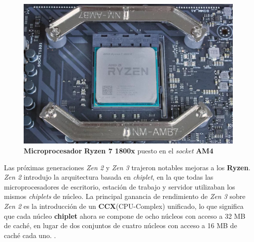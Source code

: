 \begin{figure}[htb]
	\centering
	\includegraphics[scale = 0.4]{Graphics/ryzen 7 1800x.jpg}
	\caption{\textbf {Microprocesador} \textbf{Ryzen 7 1800x} puesto en el  \emph{socket} \textbf{AM4}}
	\label{fig:28}
\end{figure}

Las próximas generaciones  \emph{Zen 2} y \emph{Zen 3}  trajeron notables mejoras a los \textbf{Ryzen}. \emph{Zen 2} introdujo la arquitectura basada en \emph{chiplet}, 
en la que todas las microprocesadores de escritorio, estación de trabajo y servidor utilizaban los mismos \emph{chiplets} de núcleo. La principal ganancia 
de rendimiento de \emph{Zen 3} sobre \emph{Zen 2} es la introducción de un \textbf{CCX}(CPU-Complex) unificado, lo que significa que cada núcleo \textbf{chiplet} 
ahora se compone de ocho núcleos con acceso a 32 MB de caché, en lugar de dos conjuntos de cuatro núcleos con acceso a 16 MB de caché cada uno.
.
